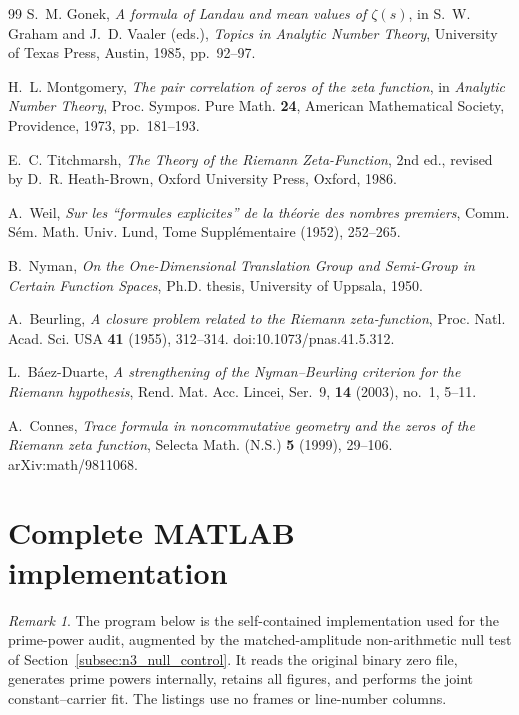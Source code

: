 \documentclass[11pt]{amsart}
\numberwithin{equation}{section}
\theoremstyle{plain}
\theoremstyle{definition}
\theoremstyle{remark}
\newtheorem{remark}[theorem]{Remark}
\newcommand{\1}{\mathbf{1}}
\begin{document}
\begin{thebibliography}{99}
S.~M. Gonek,
\emph{A formula of Landau and mean values of \(\zeta(s)\)},
in S.~W. Graham and J.~D. Vaaler (eds.),
\emph{Topics in Analytic Number Theory},
University of Texas Press, Austin, 1985, pp.~92--97.


H.~L. Montgomery,
\emph{The pair correlation of zeros of the zeta function},
in \emph{Analytic Number Theory},
Proc. Sympos. Pure Math. \textbf{24},
American Mathematical Society, Providence, 1973, pp.~181--193.

E.~C. Titchmarsh,
\emph{The Theory of the Riemann Zeta-Function},
2nd ed., revised by D.~R. Heath-Brown,
Oxford University Press, Oxford, 1986.

A.~Weil,
\emph{Sur les ``formules explicites'' de la théorie des nombres premiers},
Comm. Sém. Math. Univ. Lund, Tome Supplémentaire (1952), 252--265.


B.~Nyman,
\emph{On the One-Dimensional Translation Group and Semi-Group in Certain
Function Spaces},
Ph.D. thesis, University of Uppsala, 1950.

A.~Beurling,
\emph{A closure problem related to the Riemann zeta-function},
Proc. Natl. Acad. Sci. USA \textbf{41} (1955), 312--314.
doi:10.1073/pnas.41.5.312.

L.~B\'aez-Duarte,
\emph{A strengthening of the Nyman--Beurling criterion for the Riemann
hypothesis},
Rend. Mat. Acc. Lincei, Ser.~9, \textbf{14} (2003), no.~1, 5--11.

A.~Connes,
\emph{Trace formula in noncommutative geometry and the zeros of the Riemann
zeta function},
Selecta Math. (N.S.) \textbf{5} (1999), 29--106.
arXiv:math/9811068.

\end{thebibliography}

\appendix

\section{Complete MATLAB implementation}
\label{app:matlab}

\begin{remark}
The program below is the self-contained implementation used for the
prime-power audit, augmented by the matched-amplitude non-arithmetic null test
of Section~\ref{subsec:n3_null_control}.  It reads the original binary zero
file, generates prime powers internally, retains all figures, and performs the
joint constant--carrier fit.  The listings use no frames or line-number
columns.
\end{remark}
\end{document}
